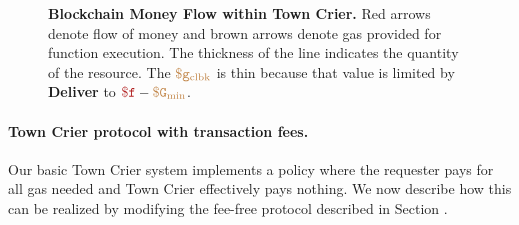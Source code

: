 \begin{figure}
\caption{{\bf Blockchain Money Flow within Town Crier.}
Red arrows denote flow of money and brown arrows denote gas provided for function execution.
The thickness of the line indicates the quantity of the resource.
The $\tt {\color{brown} \$g_\text{clbk} }$ is thin because that value is limited by {\bf Deliver} to $\fee - \constgasmin$.
}
\label{fig:money-flow}
\end{figure}



\paragraph{Town Crier protocol with transaction fees.}
Our basic Town Crier system implements a policy where the requester pays for all gas needed and Town Crier effectively pays nothing.
We now describe how this can be realized by modifying the fee-free protocol described in Section .

